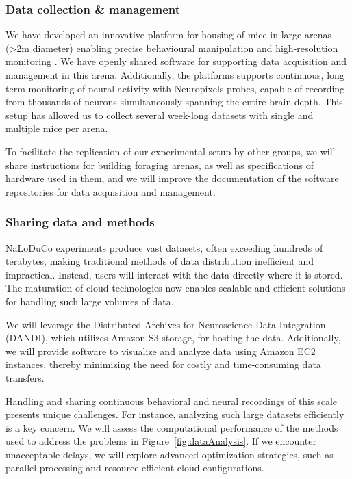 \subsubsection{Data collection \& management}

We have developed an innovative platform for housing of mice in large arenas
(\textgreater 2m diameter) enabling precise behavioural manipulation and
high-resolution monitoring \citep[Figure~\ref{fig:arena}, ][]{campagnerEtAl24}.
%
We have openly shared software for supporting data acquisition
\citep{aeonacquisition} and management \citep{aeonmecha} in this
arena.
%
Additionally, the platforms supports continuous, long term monitoring of neural
activity with Neuropixels probes, capable of recording from thousands of
neurons simultaneously spanning the entire brain depth.
%
This setup has allowed us to collect several week-long datasets with single and
multiple mice per arena.

To facilitate the replication of our experimental setup by other groups, we
will share instructions for building foraging arenas, as well as specifications
of hardware used in them,
%
and we will improve the documentation of the software repositories for data
acquisition and management.



\subsubsection{Sharing data and methods}

NaLoDuCo experiments produce vast datasets, often exceeding hundreds of
terabytes, making traditional methods of data distribution inefficient and
impractical. Instead, users will interact with the data directly where it is
stored. The maturation of cloud technologies now enables scalable and efficient
solutions for handling such large volumes of data.

We will leverage the Distributed Archives for Neuroscience Data Integration
(DANDI), which utilizes Amazon S3 storage, for hosting the data. Additionally,
we will provide software to visualize and analyze data using Amazon EC2
instances, thereby minimizing the need for costly and time-consuming data
transfers.

Handling and sharing continuous behavioral and neural recordings of this scale
presents unique challenges. For instance, analyzing such large datasets
efficiently is a key concern. We will assess the computational performance of
the methods used to address the problems in Figure~\ref{fig:dataAnalysis}. If
we encounter unacceptable delays, we will explore advanced optimization
strategies, such as parallel processing and resource-efficient cloud
configurations.

